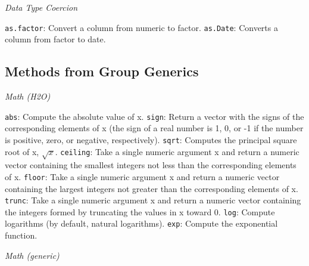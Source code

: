 {{\emph{Data Type Coercion}}\par
{\texttt{as.factor}}: Convert a column from numeric to factor.\newline
{\texttt{as.Date}}: Converts a column from factor to date.\newline

\subsection{Methods from Group Generics}

{\emph{Math (H2O)}}\par
{\texttt{abs}}: Compute the absolute value of x. \newline
{\texttt{sign}}: Return a vector with the signs of the corresponding elements of x (the sign of a real number is 1, 0, or -1 if the number is positive, zero, or negative, respectively). \newline
{\texttt{sqrt}}: Computes the principal square root of x, $\sqrt{x}$.\newline
{\texttt{ceiling}}: Take a single numeric argument x and return a numeric vector containing the smallest integers not less than the corresponding elements of x. \newline
{\texttt{floor}}: Take a single numeric argument x and return a numeric vector containing the largest integers not greater than the corresponding elements of x. \newline
{\texttt{trunc}}: Take a single numeric argument x and return a numeric vector containing the integers formed by truncating the values in x toward 0. \newline
{\texttt{log}}: Compute logarithms (by default, natural logarithms). \newline
{\texttt{exp}}: Compute the exponential function.\newline

{\emph{Math (generic)}}\par

}
